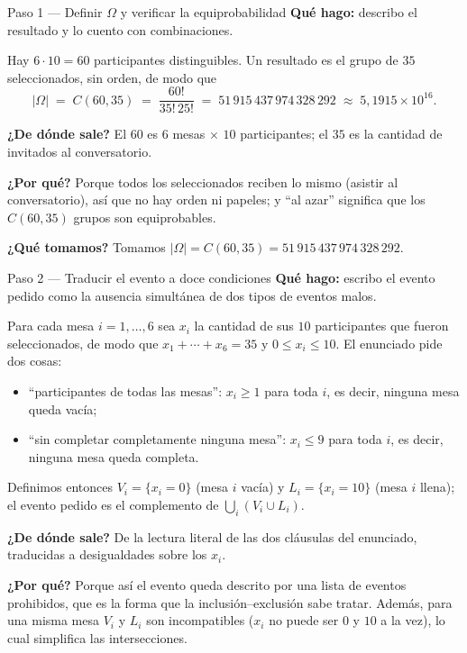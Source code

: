 \documentclass[11pt]{article}
\begin{document}
\begin{sol}

\begin{paso}{Paso 1 --- Definir $\Omega$ y verificar la equiprobabilidad}
\textbf{Qu\'e hago:} describo el resultado y lo cuento con combinaciones.

Hay $6\cdot 10=60$ participantes distinguibles. Un resultado es el grupo de $35$ seleccionados, sin orden, de modo que
\[
|\Omega| \;=\; C(60,35) \;=\; \frac{60!}{35!\,25!} \;=\; 51\,915\,437\,974\,328\,292 \;\approx\; 5{,}1915\times 10^{16}.
\]

\textbf{¿De d\'onde sale?} El $60$ es $6$ mesas $\times$ $10$ participantes; el $35$ es la cantidad de invitados al conversatorio.

\textbf{¿Por qu\'e?} Porque todos los seleccionados reciben lo mismo (asistir al conversatorio), as\'i que no hay orden ni papeles; y ``al azar'' significa que los $C(60,35)$ grupos son equiprobables.

\textbf{¿Qu\'e tomamos?} Tomamos $|\Omega|=C(60,35)=51\,915\,437\,974\,328\,292$.
\end{paso}

\begin{paso}{Paso 2 --- Traducir el evento a doce condiciones}
\textbf{Qu\'e hago:} escribo el evento pedido como la ausencia simult\'anea de dos tipos de eventos malos.

Para cada mesa $i=1,\dots,6$ sea $x_i$ la cantidad de sus $10$ participantes que fueron seleccionados, de modo que $x_1+\cdots+x_6=35$ y $0\le x_i\le 10$. El enunciado pide dos cosas:
\begin{itemize}[leftmargin=*]
  \item ``participantes de todas las mesas'': $x_i\ge 1$ para toda $i$, es decir, ninguna mesa queda vac\'ia;
  \item ``sin completar completamente ninguna mesa'': $x_i\le 9$ para toda $i$, es decir, ninguna mesa queda completa.
\end{itemize}
Definimos entonces $V_i=\{x_i=0\}$ (mesa $i$ vac\'ia) y $L_i=\{x_i=10\}$ (mesa $i$ llena); el evento pedido es el complemento de $\bigcup_i (V_i\cup L_i)$.

\textbf{¿De d\'onde sale?} De la lectura literal de las dos cl\'ausulas del enunciado, traducidas a desigualdades sobre los $x_i$.

\textbf{¿Por qu\'e?} Porque as\'i el evento queda descrito por una lista de eventos prohibidos, que es la forma que la inclusi\'on--exclusi\'on sabe tratar. Adem\'as, para una misma mesa $V_i$ y $L_i$ son incompatibles ($x_i$ no puede ser $0$ y $10$ a la vez), lo cual simplifica las intersecciones.


\end{paso}
\end{sol}
\end{document}
